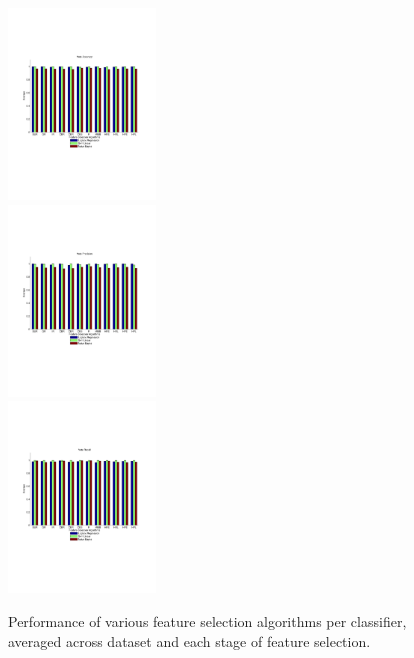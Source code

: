 \begin{figure}[tbp!]
\centering
\includegraphics[width=0.35\textwidth]{../ResultsPlot/BarGraphs/FeatureSelectionXClassifier/vote Accuracy.pdf}\\
\includegraphics[width=0.35\textwidth]{../ResultsPlot/BarGraphs/FeatureSelectionXClassifier/vote Precision.pdf}\\
\includegraphics[width=0.35\textwidth]{../ResultsPlot/BarGraphs/FeatureSelectionXClassifier/vote Recall.pdf}
\caption{\footnotesize Performance of various feature selection algorithms per classifier, averaged across dataset and each stage of feature selection.}
\label{fig:perf_vs_classifier}
\end{figure}

